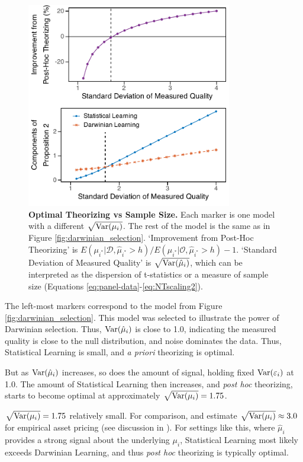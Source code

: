 \documentclass[12pt,english]{article}
\theoremstyle{plain}
\theoremstyle{plain}
\begin{document}
\begin{figure}
    \centering
    \includegraphics[width=0.8\textwidth]{exhibits/many-sd_muhat.pdf}
    \caption{\textbf{Optimal Theorizing vs Sample Size.} Each marker is one model with a different $\sqrt{\text{Var}(\mu_i)}$. The rest of the model is the same as in Figure \ref{fig:darwinian_selection}. `Improvement from Post-Hoc Theorizing' is $E\left(\mu_{i^{\ast}}|\mathcal{D}, \hat{\mu}_{i^{\ast}}>h\right)/E\left(\mu_{i^{\ast}}|\mathcal{O}, \hat{\mu}_{i^{\ast}}>h\right)-1$. `Standard Deviation of Measured Quality' is $\sqrt{\text{Var}(\hat{\mu}_i)}$, which can be interpreted as the dispersion of t-statistics or a measure of sample size (Equations \eqref{eq:panel-data}-\eqref{eq:NTscaling2}).}
    \label{fig:prop2-bigdata}
\end{figure}

The left-most markers correspond to the model from Figure \ref{fig:darwinian_selection}. This model was selected to illustrate the power of Darwinian selection. Thus, $\text{Var}(\hat{\mu}_i)$ is close to 1.0, indicating the measured quality is close to the null distribution, and noise dominates the data. Thus, Statistical Learning is small, and \emph{a priori} theorizing is optimal.

But as $\text{Var}(\hat{\mu}_i)$ increases, so does the amount of signal, holding fixed $\text{Var}(\varepsilon_i)$ at 1.0. The amount of Statistical Learning then increases, and \emph{post hoc} theorizing, starts to become optimal at approximately $\sqrt{\text{Var}(\mu_i)}=1.75$. 

$\sqrt{\text{Var}(\mu_i)}=1.75$ relatively small. For comparison, \citet{chen2020publication} and \citet{jensen2023there} estimate $\sqrt{\text{Var}(\mu_i)}\approx 3.0$ for empirical asset pricing (see discussion in \citealt{chen2022publication}). For settings like this, where $\hat{\mu}_i$ provides a strong signal about the underlying $\mu_i$, Statistical Learning most likely exceeds Darwinian Learning, and thus \emph{post hoc} theorizing is typically optimal.
\end{document}
